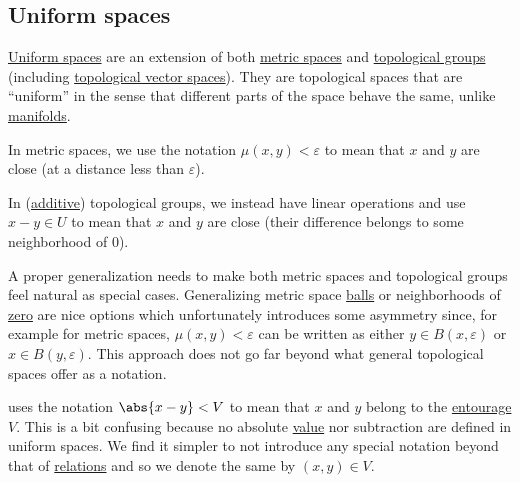 \subsection{Uniform spaces}\label{subsec:uniform_spaces}

\begin{remark}\label{rem:entourage_notation}
  \hyperref[def:uniform_space]{Uniform spaces} are an extension of both \hyperref[def:metric_space]{metric spaces} and \hyperref[def:topological_group]{topological groups} (including \hyperref[def:topological_vector_space]{topological vector spaces}). They are topological spaces that are \enquote{uniform} in the sense that different parts of the space behave the same, unlike \hyperref[def:topological_manifold]{manifolds}.

  In metric spaces, we use the notation \( \mu(x, y) < \varepsilon \) to mean that \( x \) and \( y \) are close (at a distance less than \( \varepsilon \)).

  In (\hyperref[rem:additive_magma]{additive}) topological groups, we instead have linear operations and use \( x - y \in U \) to mean that \( x \) and \( y \) are close (their difference belongs to some neighborhood of \( 0 \)).

  A proper generalization needs to make both metric spaces and topological groups feel natural as special cases. Generalizing metric space \hyperref[def:metric_space/ball]{balls} or neighborhoods of \hyperref[thm:origin_neighborhoods_in_topological_groups]{zero} are nice options which unfortunately introduces some asymmetry since, for example for metric spaces, \( \mu(x, y) < \varepsilon \) can be written as either \( y \in B(x, \varepsilon) \) or \( x \in B(y, \varepsilon) \). This approach does not go far beyond what general topological spaces offer as a notation.

  \cite[section 8]{Engelking1989} uses the notation \( \abs{x - y} < V \) to mean that \( x \) and \( y \) belong to the \hyperref[def:entourage]{entourage} \( V \). This is a bit confusing because no absolute \hyperref[def:absolute_value]{value} nor subtraction are defined in uniform spaces. We find it simpler to not introduce any special notation beyond that of \hyperref[def:relation]{relations} and so we denote the same by \( (x, y) \in V \).
\end{remark}

